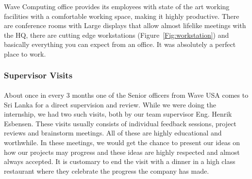 Wave Computing office provides its employees with state of the art working facilities with a comfortable working space, making it highly productive. There are conference rooms with Large displays that allow almost lifelike meetings with the HQ, there are cutting edge workstations (Figure~\ref{Fig:workstation}) and basically everything you can expect from an office. It was absolutely a perfect place to work.

\subsubsection{Supervisor Visits}
\paragraph{}
About once in every 3 months one of the Senior officers from Wave USA comes to Sri Lanka for a direct supervision and review. While we were doing the internship, we had two such visits, both by our team supervisor Eng. Henrik Esbensen. These visits usually consists of individual feedback sessions, project reviews and brainstorm meetings. All of these are highly educational and worthwhile. In these meetings, we would get the chance to present our ideas on how our projects may progress and these ideas are highly respected and almost always accepted. It is customary to end the visit with a dinner in a high class restaurant where they celebrate the progress the company has made.

 